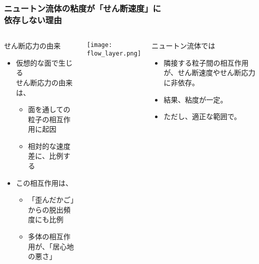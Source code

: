 \documentclass[12pt, dvipdfmx]{beamer}
\begin{document}
\begin{frame}
	\frametitle{ニュートン流体の粘度が「せん断速度」に\\依存しない理由}
		\vspace{-3mm}
		\begin{columns}[T, onlytextwidth]
				\begin{block}{せん断応力の由来}
					\begin{itemize}
						\item 仮想的な面で生じる\\せん断応力の由来は、
						\begin{itemize}
							\item \alert{面を通しての粒子の相互作用}に起因
							\item 相対的な速度差に、比例する
						\end{itemize}
						\item この相互作用は、
						\begin{itemize}
							\item 「歪んだかご」からの脱出頻度にも比例
							\item 多体の相互作用が、「居心地の悪さ」
						\end{itemize}
					\end{itemize}
				\end{block}
				\vspace{3mm}
				\texttt{[image: flow\_layer.png]}
				\begin{exampleblock}{ニュートン流体では}
					\begin{itemize}
						\item 隣接する粒子間の相互作用が、\alert{せん断速度やせん断応力に非依存。}
						\item 結果、粘度が一定。
						\item ただし、\alert{適正な範囲で。}
					\end{itemize}
				\end{exampleblock}
		\end{columns}
\end{frame}
\end{document}
